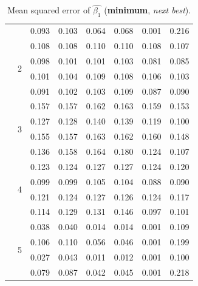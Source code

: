 \documentclass[authoryear, review, 11pt]{elsarticle}
\begin{document}
\begin{table}[ht]
\begin{center}
{\begin{tabular}{ccrrrrrr}
   &  & 0.093 & 0.103 & 0.064 & 0.068 & 0.001 & 0.216 \\ 
   \cline{3-8}
 & \multirow{4}{*}{ 2 }  & 0.108 & 0.108 & 0.110 & 0.110 & 0.108 & 0.107 \\ 
   &  & 0.098 & 0.101 & 0.101 & 0.103 & 0.081 & 0.085 \\ 
   &  & 0.101 & 0.104 & 0.109 & 0.108 & 0.106 & 0.103 \\ 
   &  & 0.091 & 0.102 & 0.103 & 0.109 & 0.087 & 0.090 \\ 
   \cline{3-8}
 & \multirow{4}{*}{ 3 }  & 0.157 & 0.157 & 0.162 & 0.163 & 0.159 & 0.153 \\ 
   &  & 0.127 & 0.128 & 0.140 & 0.139 & 0.119 & 0.100 \\ 
   &  & 0.155 & 0.157 & 0.163 & 0.162 & 0.160 & 0.148 \\ 
   &  & 0.136 & 0.158 & 0.164 & 0.180 & 0.124 & 0.107 \\ 
   \cline{3-8}
 & \multirow{4}{*}{ 4 }  & 0.123 & 0.124 & 0.127 & 0.127 & 0.124 & 0.120 \\ 
   &  & 0.099 & 0.099 & 0.105 & 0.104 & 0.088 & 0.090 \\ 
   &  & 0.121 & 0.124 & 0.127 & 0.126 & 0.124 & 0.117 \\ 
   &  & 0.114 & 0.129 & 0.131 & 0.146 & 0.097 & 0.101 \\ 
   \cline{3-8}
 & \multirow{4}{*}{ 5 }  & 0.038 & 0.040 & 0.014 & 0.014 & 0.001 & 0.109 \\ 
   &  & 0.106 & 0.110 & 0.056 & 0.046 & 0.001 & 0.199 \\ 
   &  & 0.027 & 0.043 & 0.011 & 0.012 & 0.001 & 0.100 \\ 
   &  & 0.079 & 0.087 & 0.042 & 0.045 & 0.001 & 0.218 \\ 
  \end{tabular}}
\caption{Mean squared error of $\hat{\beta_1}$ (\textbf{minimum}, \emph{next best}).\label{table:msex}}
\end{center}
\end{table}
\end{document}
